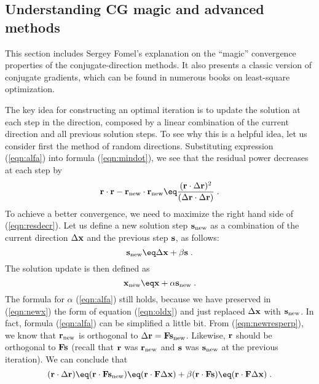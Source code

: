 \subsection{Understanding CG magic and advanced methods}
This section includes Sergey Fomel's explanation on the ``magic''
convergence properties of the conjugate-direction methods. It also
presents a classic version of conjugate gradients, which can be found
in numerous books on least-square optimization.

The key idea for constructing an optimal iteration is to update the
solution at each step in the direction, composed by a linear
combination of the current direction and all previous solution steps.
To see why this is a helpful idea, let us consider first the method of
random directions. Substituting expression (\ref{eqn:alfa}) into
formula (\ref{eqn:mindot}), we see that the residual power
decreases at each step by
\begin{equation}
  \label{eqn:resdecr}
  \bold r \cdot \bold r -
  \bold r_{\rm new} \cdot \bold r_{\rm new} \eq
  \frac{(\bold r \cdot \Delta \bold r )^2}
  {( \Delta \bold r \cdot \Delta \bold r )}\;.
\end{equation}
To achieve a better convergence, we need to maximize the right hand
side of (\ref{eqn:resdecr}). Let us define a new solution step $\bold
s_{\rm new}$ as a combination of the current direction $\Delta \bold
x$ and the previous step $\bold s$, as follows:
\begin{equation}
  \label{eqn:snew}
  \bold s_{\rm new} \eq \Delta \bold x + \beta \bold s\;.
\end{equation}
The solution update is then defined as
\begin{equation}
\bold x_{\rm new} \eq \bold x+\alpha \bold s_{\rm new}\;.
\label{eqn:newx}
\end{equation}
The formula for $\alpha$ (\ref{eqn:alfa}) still holds, because we have
preserved in (\ref{eqn:newx}) the form of equation (\ref{eqn:oldx})
and just replaced $\Delta \bold x$ with $\bold s_{\rm new}$. In fact,
formula (\ref{eqn:alfa}) can be simplified a little bit. From
(\ref{eqn:newresperp}), we know that $\bold r_{\rm new}$ is orthogonal
to $\Delta \bold r = \bold F \bold s_{\rm new}$. Likewise, $\bold r$
should be orthogonal to $\bold F \bold s$ (recall that $\bold r$ was
$\bold r_{\rm new}$ and $\bold s$ was $\bold s_{\rm new}$ at the
previous iteration). We can conclude that
\begin{equation}
  \label{eqn:rdr}
  (\bold r \cdot \Delta \bold r ) \eq 
  (\bold r \cdot \bold F \bold s_{\rm new}) \eq
  (\bold r \cdot \bold F \Delta \bold x) + 
  \beta (\bold r \cdot \bold F \bold s) \eq
  (\bold r \cdot \bold F \Delta \bold x)\;.
\end{equation}
